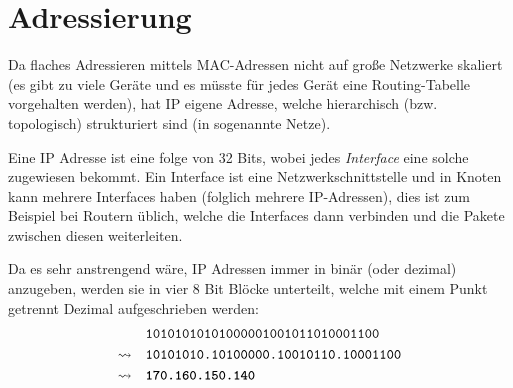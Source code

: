     \section{Adressierung}
        Da flaches Adressieren mittels MAC-Adressen nicht auf große Netzwerke skaliert (es gibt zu viele Geräte und es müsste für jedes Gerät eine Routing-Tabelle vorgehalten werden), hat IP eigene Adresse, welche hierarchisch (bzw. topologisch) strukturiert sind (in sogenannte Netze).
        
        Eine IP Adresse ist eine folge von 32 Bits, wobei jedes \textit{Interface} eine solche zugewiesen bekommt. Ein Interface ist eine Netzwerkschnittstelle und in Knoten kann mehrere Interfaces haben (folglich mehrere IP-Adressen), dies ist zum Beispiel bei Routern üblich, welche die Interfaces dann verbinden und die Pakete zwischen diesen weiterleiten.
        
        Da es sehr anstrengend wäre, IP Adressen immer in binär (oder dezimal) anzugeben, werden sie in vier 8 Bit Blöcke unterteilt, welche mit einem Punkt getrennt Dezimal aufgeschrieben werden:
        \begin{align*}
        	                 & \quad\texttt{10101010101000001001011010001100}    \\
        	\rightsquigarrow & \quad\texttt{10101010.10100000.10010110.10001100} \\
        	\rightsquigarrow & \quad\textbf{\texttt{170.160.150.140}}
        \end{align*}
        
